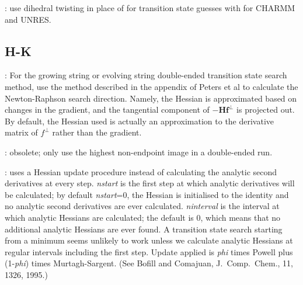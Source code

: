 {{: use dihedral twisting in place of  for 
transition state guesses with  for CHARMM and UNRES.

\subsection{H-K}
: For the growing string or evolving string double-ended
  transition state search method, use the method described in the appendix of
  Peters et al\cite{PetersHBC04} to calculate the Newton-Raphson search
  direction. Namely, the Hessian is approximated based on changes in the
  gradient, and the tangential component of $-\mathbf{Hf^\perp}$ is projected
  out. By default, the Hessian used is actually an approximation to the
  derivative matrix of $f^\perp$ rather than the gradient.

: obsolete; 
only use the highest non-endpoint image in a double-ended {} run.

: uses a Hessian update 
procedure instead
of calculating the analytic second derivatives at every step. 
{\it nstart\/} is the first step at which analytic derivatives will be calculated; by
default {\it nstart\/}=0, the Hessian is initialised to the identity and no
analytic second derivatives are ever calculated. {\it ninterval\/} is the interval
at which analytic Hessians are calculated; the default is 0, which means that no
additional analytic Hessians are ever found. A transition state search starting from
a minimum seems unlikely to work unless we calculate analytic Hessians at regular
intervals including the first step. Update applied is
{\it phi\/} times Powell\cite{powell71} plus (1-{\it phi}) times Murtagh-Sargent.
(See Bofill and Comajuan, J.~Comp.~Chem., 11, 1326, 1995.)


}}
